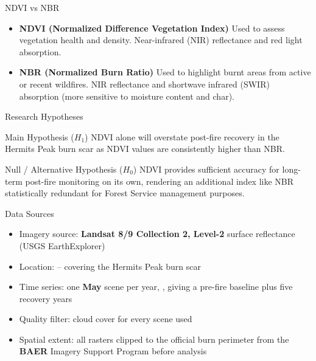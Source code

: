 \documentclass[10pt, aspectratio=169]{beamer}
\begin{document}


\begin{frame}{NDVI vs NBR}
\begin{itemize}
    \item \textbf{NDVI (Normalized Difference Vegetation Index)} Used to assess vegetation health and density.  Near-infrared (NIR) reflectance and red light absorption. 
    \item \textbf{NBR (Normalized Burn Ratio)} Used to highlight burnt areas from active or recent wildfires. NIR reflectance and shortwave infrared (SWIR) absorption (more sensitive to \alert{moisture content and char}).

    
\end{itemize}
\end{frame}
\begin{frame}{Research Hypotheses}
\begin{block}{Main Hypothesis ($H_1$)}
{NDVI alone will overstate post-fire recovery} in the Hermits Peak burn scar as NDVI values are consistently higher than NBR. 
\end{block}

\vspace{0.8em}

\begin{exampleblock}{Null / Alternative Hypothesis ($H_0$)}
{NDVI provides sufficient accuracy} for long-term post-fire monitoring on its own, rendering an additional index like NBR statistically redundant for Forest Service management purposes.
\end{exampleblock}
\end{frame}

\begin{frame}{Data Sources}
\begin{itemize}
    \item Imagery source: \textbf{Landsat 8/9 Collection 2, Level-2} surface reflectance (USGS EarthExplorer)
    \item Location:  -- covering the Hermits Peak burn scar
    \item Time series: one \textbf{May} scene per year, , giving a pre-fire baseline plus five recovery years
    \item Quality filter: cloud cover  for every scene used
    \item Spatial extent: all rasters clipped to the official burn perimeter from the \textbf{BAER} Imagery Support Program before analysis
\end{itemize}
\end{frame}
\end{document}
